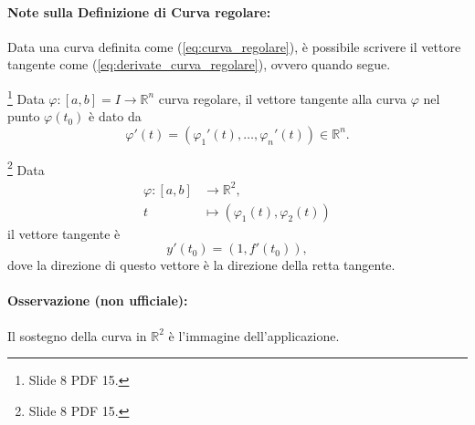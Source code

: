 \paragraph{Note sulla Definizione di Curva regolare:} Data una curva definita come (\ref{eq:curva_regolare}), è possibile scrivere il vettore tangente come (\ref{eq:derivate_curva_regolare}), ovvero quando segue.

\begin{definition}\footnote{Slide 8 PDF 15.}
	Data $	\varphi:[a,b]=I\rightarrow\mathbb{R}^n$ curva regolare, il vettore tangente alla curva $\varphi$ nel punto $\varphi(t_0)$ è dato da
	\begin{equation*}
			\varphi'(t)=(\varphi_1'(t), \hdots, \varphi_n'(t))\in\mathbb{R}^n.
	\end{equation*}
\end{definition}
 
\begin{example}\footnote{Slide 8 PDF 15.}
 	Data
 	\begin{equation}
 	\begin{aligned}
 		\varphi:[a,b]&\rightarrow\mathbb{R}^2,\\
 		t&\mapsto (\varphi_1(t),\varphi_2(t))
 	\end{aligned}
 	\end{equation}
 	il vettore tangente è 
 	\begin{equation*}
 		y'(t_0) = (1,f'(t_0)),
 	\end{equation*}
 	dove la direzione di questo vettore è la direzione della retta tangente.
\end{example}
 
\paragraph{Osservazione (non ufficiale):} Il sostegno della curva in $\mathbb{R}^2$ è l'immagine dell'applicazione.
 
